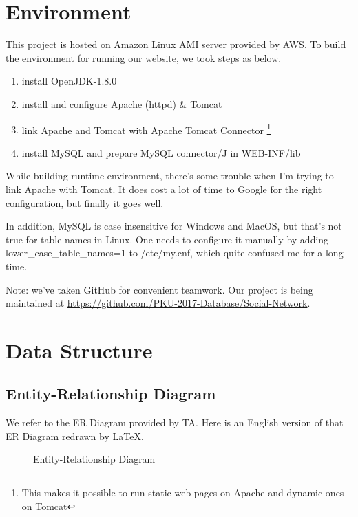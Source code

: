 \section{Environment}

This project is hosted on Amazon Linux AMI server provided by AWS. To build the environment for running our website, we took steps as below.

\begin{enumerate}
	\item install OpenJDK-1.8.0
	\item install and configure Apache (httpd) \& Tomcat
	\item link Apache and Tomcat with Apache Tomcat Connector \footnote{This makes it possible to run static web pages on Apache and dynamic ones on Tomcat}
	\item install MySQL and prepare MySQL connector/J in WEB-INF/lib
\end{enumerate}

While building runtime environment, there's some trouble when I'm trying to link Apache with Tomcat. It does cost a lot of time to Google for the right configuration, but finally it goes well.

In addition, MySQL is case insensitive for Windows and MacOS, but that's not true for table names in Linux. One needs to configure it manually by adding lower\_case\_table\_names=1 to /etc/my.cnf, which quite confused me for a long time.

Note: we've taken GitHub for convenient teamwork. Our project is being maintained at \url{https://github.com/PKU-2017-Database/Social-Network}.

\section{Data Structure}

\subsection{Entity-Relationship Diagram}

We refer to the ER Diagram provided by TA. Here is an English version of that ER Diagram redrawn by \LaTeX.

\begin{figure}[htbp]
	\begin{center}
		
	\end{center}
	\caption{Entity-Relationship Diagram}
\end{figure}

